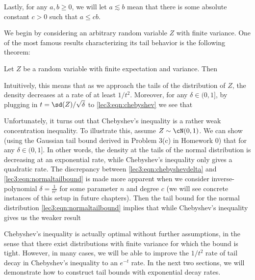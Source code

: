 Lastly, for any $a, b \geq 0$, we will let $a \lesssim b$ mean that there is some absolute constant $c > 0$ such that $a \leq cb$.

We begin by considering an arbitrary random variable $Z$ with finite variance. One of the most famous results characterizing its tail behavior is the following theorem:

\begin{theorem}
    Let $Z$ be a random variable with finite expectation and variance. Then
\end{theorem}

Intuitively, this means that as we approach the tails of the distribution of $Z$, the density decreases at a rate of at least $1 / t^2$. Moreover, for any $\delta \in (0, 1]$, by plugging in $t = \sd(Z) / \sqrt{\delta}$ to \eqref{lec3:eqn:chebyshev} we see that 
    
Unfortunately, it turns out that Chebyshev's inequality is a rather weak concentration inequality. To illustrate this, assume $Z \sim \cN(0, 1)$. We can show (using the Gaussian tail bound derived in Problem 3(c) in Homework 0) that
for any $\delta \in (0, 1]$. In other words, the density at the tails of the normal distribution is decreasing at an exponential rate, while Chebyshev's inequality only gives a quadratic rate. The discrepancy between \eqref{lec3:eqn:chebyshevdelta} and \eqref{lec3:eqn:normaltailbound} is made more apparent when we consider inverse-polynomial $\delta = \frac{1}{n^c}$ for some parameter $n$ and degree $c$ (we will see concrete instances of this setup in future chapters). Then the tail bound for the normal distribution \eqref{lec3:eqn:normaltailbound} implies that
while Chebyshev's inequality gives us the weaker result

Chebyshev's inequality is actually optimal without further assumptions, in the sense that there exist distributions with finite variance for which the bound is tight. However, in many cases, we will be able to improve the $1/t^2$ rate of tail decay in Chebyshev's inequality to an $e^{-t}$ rate. In the next two sections, we will demonstrate how to construct tail bounds with exponential decay rates.

